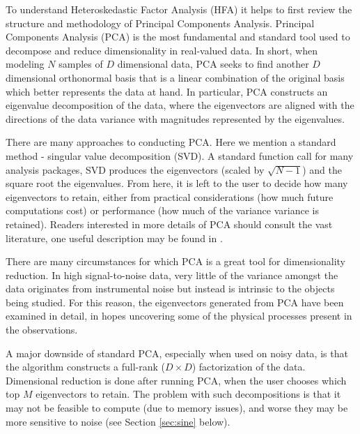 \documentclass[12pt,preprint]{aastex}
\begin{document}
To understand Heteroskedastic Factor Analysis (HFA) it helps to first review the 
structure and methodology of Principal Components Analysis.  Principal Components 
Analysis (PCA) \citep{pearson01, hotelling33} is the most fundamental and standard 
tool used to decompose and reduce dimensionality in real-valued data.  In short, when 
modeling $N$ samples of $D$ dimensional data, PCA seeks to find another $D$ dimensional 
orthonormal basis that is a linear combination of the original basis which better represents 
the data at hand.  In particular, PCA constructs an eigenvalue decomposition of the data, 
where the eigenvectors are aligned with the directions of the data variance with magnitudes 
represented by the eigenvalues.  

There are many approaches to conducting PCA.  Here we mention a
standard method - singular value decomposition (SVD).  A standard
function call for many analysis packages, SVD produces the
eigenvectors (scaled by $\sqrt{N-1}$) and the square root the
eigenvalues.  From here, it is left to the user to decide how many
eigenvectors to retain, either from practical considerations (how much
future computations cost) or performance (how much of the variance
variance is retained).  Readers interested in more details of PCA
should consult the vast literature, one useful description may be
found in \citet{bishop06}.

There are many circumstances for which PCA is a great tool for
dimensionality reduction.  In high signal-to-noise data, very little
of the variance amongst the data originates from instrumental noise but
instead is intrinsic to the objects being studied.  For this reason,
the eigenvectors generated from PCA have been examined in detail, in
hopes uncovering some of the physical processes present in the
observations.

A major downside of standard PCA, especially when used on noisy data, 
is that the algorithm constructs a full-rank ($D \times D$) factorization of the 
data.  Dimensional reduction is done after running PCA, when the user 
chooses which top $M$ eigenvectors to retain. The problem with such 
decompositions is that it may not be feasible to compute (due to memory 
issues), and worse they may be more sensitive to noise (see Section \ref{sec:sine} 
below).  
\end{document}

